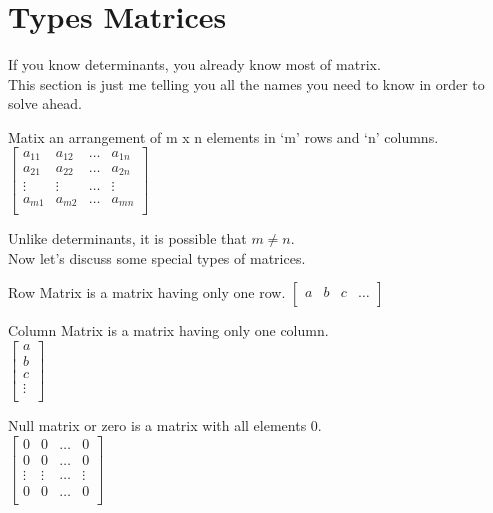 \section{Types Matrices}
If you know determinants, you already know most of matrix.\\
This section is just me telling you all the names you need to know in order to solve ahead.\\
\begin{definition}
    Matix an arrangement of m x n elements in ‘m’ rows and ‘n’ columns.
    $\begin{bmatrix}
        a_{11} & a_{12} & \dots & a_{1n} \\
        a_{21} & a_{22} & \dots & a_{2n} \\
        \vdots & \vdots & \dots & \vdots \\
        a_{m1} & a_{m2} & \dots & a_{mn} \\
    \end{bmatrix}$
\end{definition}
Unlike determinants, it is possible that $m \neq n$. \\
Now let's discuss some special types of matrices.\\
\begin{definition}
    Row Matrix is a matrix having only one row.
    $\begin{bmatrix}
        a & b & c & \dots\\ 
    \end{bmatrix}$
\end{definition}
\begin{definition}
    Column Matrix is a matrix having only one column.\\
    $\begin{bmatrix}
        a\\
        b\\
        c\\
        \vdots\\
    \end{bmatrix}$
\end{definition}
\begin{definition}
    Null matrix or zero is a matrix with all elements 0.\\
    $\begin{bmatrix}
        0 & 0 & \dots & 0 \\
        0 & 0 & \dots & 0 \\
        \vdots & \vdots & \dots & \vdots \\
        0 & 0 & \dots & 0 \\
    \end{bmatrix}$
\end{definition}
